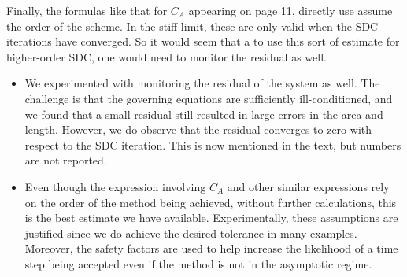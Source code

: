 \documentclass[12pt]{article}
\newcommand{\comment}[1]{{\color{blue} #1}}
\begin{document}
\comment{Finally, the formulas like that for $C_{A}$ appearing on page
11, directly use assume the order of the scheme. In the stiff limit,
these are only valid when the SDC iterations have converged. So it would
seem that a to use this sort of estimate for higher-order SDC, one would
need to monitor the residual as well.}
\begin{itemize}
  \item We experimented with monitoring the residual of the system as
  well.  The challenge is that the governing equations are sufficiently
  ill-conditioned, and we found that a small residual still resulted in
  large errors in the area and length.  However, we do observe that the
  residual converges to zero with respect to the SDC iteration.  This is
  now mentioned in the text, but numbers are not reported.
  \item Even though the expression involving $C_{A}$ and other similar
  expressions rely on the order of the method being achieved, without
  further calculations, this is the best estimate we have available.
  Experimentally, these assumptions are justified since we do achieve
  the desired tolerance in many examples.  Moreover, the safety factors
  are used to help increase the likelihood of a time step being accepted
  even if the method is not in the asymptotic regime.
\end{itemize}
\end{document}
